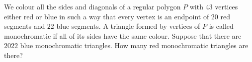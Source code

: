 We colour all the sides and diagonals of a regular polygon \(P\) with \(43\) vertices either red or blue in such a way that every vertex is an endpoint of \(20\) red segments and \(22\) blue segments. A triangle formed by vertices of \(P\) is called monochromatic if all of its sides have the same colour. Suppose that there are \(2022\) blue monochromatic triangles. How many red monochromatic triangles are there?
